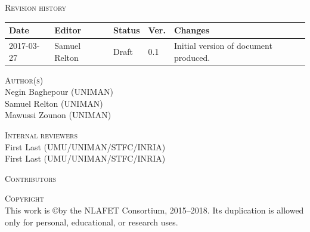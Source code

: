 \documentclass[a4paper,12pt]{article}
\begin{document}
\vspace{2em}




\noindent
\textsc{Revision history}\\[1em]
\begin{tabularx}{\linewidth}{@{}|l|l|l|l|X|}
  \hline
  \rowcolor{orange}
  \bf Date & \bf Editor & \bf Status & \bf Ver. & \bf Changes \\
  \hline
  2017-03-27 & Samuel Relton & Draft & 0.1 & Initial version of
                                             document produced. \\
  \hline
\end{tabularx}

\vspace{2em}


\noindent
\textsc{Author(s)}\\[1em]
Negin Baghepour (UNIMAN)\\
Samuel Relton (UNIMAN)\\
Mawussi Zounon (UNIMAN)

\vspace{2em}





\noindent
\textsc{Internal reviewers}\\[1em]
First Last (UMU/UNIMAN/STFC/INRIA)\\
First Last (UMU/UNIMAN/STFC/INRIA)

\vspace{2em}






\noindent
\textsc{Contributors}\\[1em]

\vspace{2em}





\noindent
\textsc{Copyright}\\[1em]
This work is \copyright by the NLAFET Consortium, 2015--2018.
Its duplication is allowed only for personal, educational, or research uses.

\vspace{2em}
\end{document}
